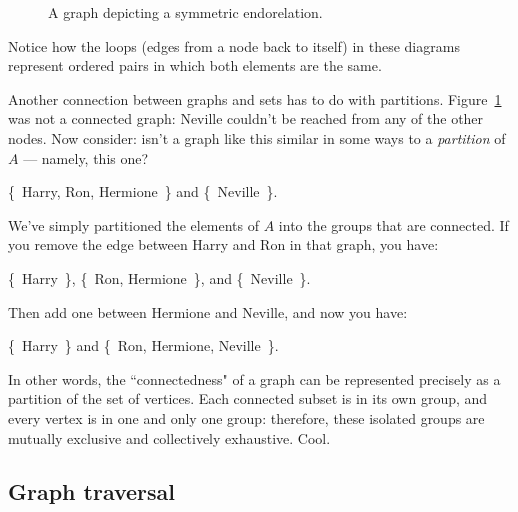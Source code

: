 \begin{figure}[ht]
\centering
\caption{A graph depicting a symmetric endorelation.}
\label{symrelationgraph}
\end{figure}

Notice how the loops (edges from a node back to itself) in these diagrams
represent ordered pairs in which both elements are the same.

Another connection between graphs and sets has to do with partitions.
Figure~\ref{symrelationgraph} was not a connected graph: Neville couldn't
be reached from any of the other nodes. Now consider: isn't a graph like
this similar in some ways to a \textit{partition} of $A$ --- namely, this
one?

\begin{center}
\{~Harry, Ron, Hermione~\} and
\{~Neville~\}.
\end{center}

We've simply partitioned the elements of $A$ into the groups that are
connected. If you remove the edge between Harry and Ron in that graph, you
have:

\begin{center}
\{~Harry~\},
\{~Ron, Hermione~\}, and
\{~Neville~\}.
\end{center}

Then add one between Hermione and Neville, and now you have:

\begin{center}
\{~Harry~\} and
\{~Ron, Hermione, Neville~\}.
\end{center}

In other words, the ``connectedness" of a graph can be represented
precisely as a partition of the set of vertices. Each connected subset is
in its own group, and every vertex is in one and only one group: therefore,
these isolated groups are mutually exclusive and collectively exhaustive.
Cool.

\subsection{Graph traversal}

